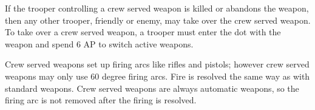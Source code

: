 If the trooper controlling a crew served weapon is killed or abandons the weapon, then any other trooper, friendly or enemy, may take over the crew served weapon.
To take over a crew served weapon, a trooper must enter the dot with the weapon and spend 6 AP to switch active weapons.

Crew served weapons set up firing arcs like rifles and pistols; however crew served weapons may only use 60 degree firing arcs.
Fire is resolved the same way as with standard weapons.
Crew served weapons are always automatic weapons, so the firing arc is not removed after the firing is resolved.
